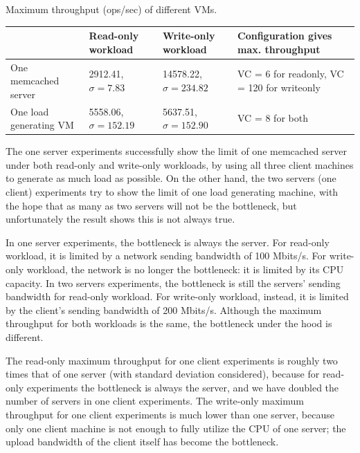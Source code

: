 \begin{center}
	{Maximum throughput (ops/sec) of different VMs.}
	\begin{tabular}{|l|p{2cm}|p{2cm}|p{4cm}|}
		\hline                        & Read-only workload & Write-only workload & Configuration gives max. throughput \\ 
		\hline One memcached server   &   2912.41, $\sigma=7.83$     &  14578.22, $\sigma=234.82$        &                     VC = 6 for readonly, VC = 120 for writeonly         \\ 
		\hline One load generating VM &   5558.06, $\sigma=152.19$   &  5637.51, $\sigma=152.90$                &            VC = 8 for both                 \\ 
		\hline 
	\end{tabular}
\end{center}


The one server experiments successfully show the limit of one memcached server under both read-only and write-only workloads, by using all three client machines to generate as much load as possible. On the other hand, the two servers (one client) experiments try to show the limit of one load generating machine, with the hope that as many as two servers will not be the bottleneck, but unfortunately the result shows this is not always true.

In one server experiments, the bottleneck is always the server. For read-only workload, it is limited by a network sending bandwidth of 100 Mbits/s. For write-only workload, the network is no longer the bottleneck: it is limited by its CPU capacity.
In two servers experiments, the bottleneck is still the servers' sending bandwidth for read-only workload. For write-only workload, instead, it is limited by the client's sending bandwidth of 200 Mbits/s. Although the maximum throughput for both workloads is the same, the bottleneck under the hood is different.

The read-only maximum throughput for one client experiments is roughly two times that of one server (with standard deviation considered), because for read-only experiments the bottleneck is always the server, and we have doubled the number of servers in one client experiments.
The write-only maximum throughput for one client experiments is much lower than one server, because only one client machine is not enough to fully utilize the CPU of one server; the upload bandwidth of the client itself has become the bottleneck.


